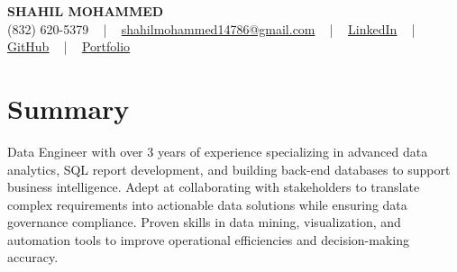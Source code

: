 \documentclass[letterpaper,10pt]{article}
\begin{document}
\begin{center}
    {\fontsize{14pt}{12pt}\selectfont \textbf{\MakeUppercase{Shahil Mohammed}}}\\ \vspace{2pt}
    \fontsize{10pt}{12pt}\selectfont (832) 620-5379 ~ | ~ \href{mailto:shahilmohammed14786@gmail.com}{shahilmohammed14786@gmail.com} ~ | ~  
    \href{https://www.linkedin.com/in/shahil-mohammed-9652931a1/}{\color{blue}\underline{LinkedIn}}  ~ | ~ 
    \href{https://github.com/freakbeast14}{\color{blue}\underline{GitHub}} ~ | ~ 
    \href{https://shahil-mohammed.netlify.app/}{\color{blue}\underline{Portfolio}}
    \vspace{-8pt}
\end{center}

\section{Summary}
\vspace{-2pt}\fontsize{8pt}{9pt}\selectfont
Data Engineer with over 3 years of experience specializing in advanced data analytics, SQL report development, and building back-end databases to support business intelligence. Adept at collaborating with stakeholders to translate complex requirements into actionable data solutions while ensuring data governance compliance. Proven skills in data mining, visualization, and automation tools to improve operational efficiencies and decision-making accuracy.
 \vspace{-5pt}
 
\vspace{-2pt}
\end{document}
